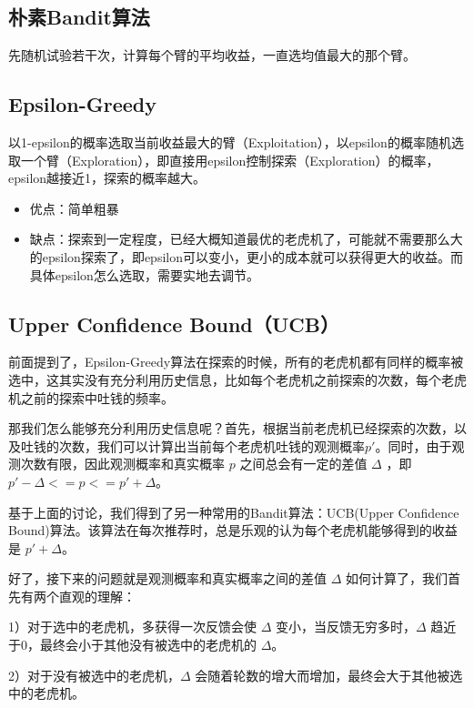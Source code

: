\documentclass[12pt]{article}
\begin{document}
\subsection{朴素Bandit算法}
先随机试验若干次，计算每个臂的平均收益，一直选均值最大的那个臂。

\subsection{Epsilon-Greedy}
以1-epsilon的概率选取当前收益最大的臂（Exploitation），以epsilon的概率随机选取一个臂（Exploration），即直接用epsilon控制探索（Exploration）的概率，epsilon越接近1，探索的概率越大。
\begin{itemize}
\setlength{\itemsep}{0pt}
\setlength{\parsep}{0pt}
\setlength{\parskip}{0pt}
    \item 优点：简单粗暴
    \item 缺点：探索到一定程度，已经大概知道最优的老虎机了，可能就不需要那么大的epsilon探索了，即epsilon可以变小，更小的成本就可以获得更大的收益。而具体epsilon怎么选取，需要实地去调节。
\end{itemize}

\subsection{Upper Confidence Bound（UCB）}
前面提到了，Epsilon-Greedy算法在探索的时候，所有的老虎机都有同样的概率被选中，这其实没有充分利用历史信息，比如每个老虎机之前探索的次数，每个老虎机之前的探索中吐钱的频率\cite{Recommender_System_With_Deep_Learning_Bandit}。

那我们怎么能够充分利用历史信息呢？首先，根据当前老虎机已经探索的次数，以及吐钱的次数，我们可以计算出当前每个老虎机吐钱的观测概率$p'$。同时，由于观测次数有限，因此观测概率和真实概率 $p$ 之间总会有一定的差值 $ \Delta $ ，即 $p' - \Delta <= p <= p' +  \Delta $。

基于上面的讨论，我们得到了另一种常用的Bandit算法：UCB(Upper Confidence Bound)算法。该算法在每次推荐时，总是乐观的认为每个老虎机能够得到的收益是 $p' +  \Delta $。

好了，接下来的问题就是观测概率和真实概率之间的差值 $ \Delta $ 如何计算了，我们首先有两个直观的理解：

1）对于选中的老虎机，多获得一次反馈会使 $ \Delta $ 变小，当反馈无穷多时，$ \Delta $ 趋近于0，最终会小于其他没有被选中的老虎机的 $ \Delta $。

2）对于没有被选中的老虎机，$ \Delta $ 会随着轮数的增大而增加，最终会大于其他被选中的老虎机。
\end{document}
